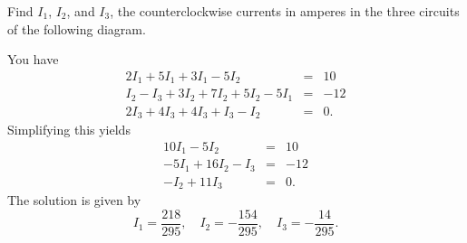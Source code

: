 \begin{ex} Find $I_1$, $I_2$, and $I_3$, the counterclockwise currents in
  amperes in the three circuits of the following diagram.

  \begin{center}
  \end{center}

  \begin{sol}
    You
    have
    \begin{eqnarray*}
      2I_1 + 5I_1 + 3I_1 - 5I_2 &=& 10 \\
      I_2 - I_3 + 3I_2 + 7I_2 + 5I_2 - 5I_1 &=& -12 \\
      2I_3 + 4I_3 + 4I_3 + I_3 - I_2 &=& 0.
    \end{eqnarray*}
    Simplifying this yields
    \begin{eqnarray*}
      10I_1 - 5I_2 &=& 10 \\
      -5I_1 + 16I_2 - I_3 &=& -12 \\
      -I_2 + 11I_3 &=& 0.
    \end{eqnarray*}
    The solution is given by
    \begin{equation*}
      I_1 = \frac{218}{295},\quad
      I_2 = -\frac{154}{295},\quad
      I_3 = -\frac{14}{295}.
    \end{equation*}

  \end{sol}
\end{ex}

